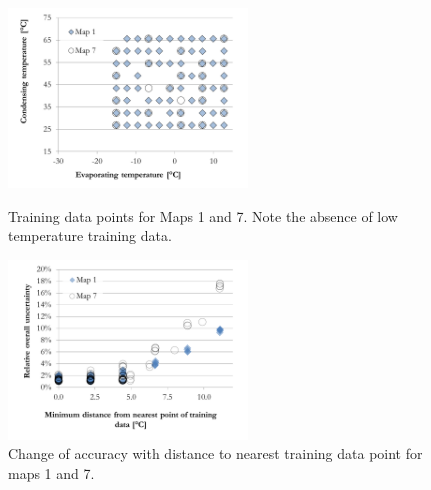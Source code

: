 \begin{figure}[h]
\begin{minipage}{15pc}
\includegraphics[width=15pc]{./fig/Map_1_and_7_training_data.pdf}
\caption{\label{fig:map_1_7_training_data}Training data points for Maps 1 and 7. Note the absence of low temperature training data.}
\end{minipage}\hspace{2pc}%
\begin{minipage}{15pc}
\includegraphics[width=15pc]{./fig/Map_1_and_7_C_distance.pdf}
\caption{\label{fig:map_1_7_unc_C_distance}Change of accuracy with distance to nearest training data point for maps 1 and 7.}
\end{minipage} 
\end{figure}

